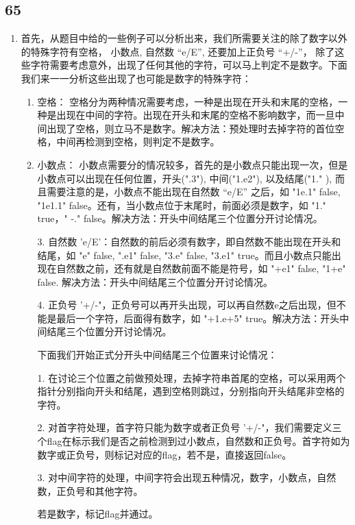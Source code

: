 \documentclass[12pt,a4paper]{article}
\begin{document}
\subsection{65}
\begin{enumerate}
\item
\begin{CJK}{UTF8}{gbsn}
首先，从题目中给的一些例子可以分析出来，我们所需要关注的除了数字以外的特殊字符有空格， 小数点, 自然数 ``e/E'', 还要加上正负号 ``+/-''，
除了这些字符需要考虑意外，出现了任何其他的字符，可以马上判定不是数字。下面我们来一一分析这些出现了也可能是数字的特殊字符：
\begin{enumerate}
\item 空格： 空格分为两种情况需要考虑，一种是出现在开头和末尾的空格，一种是出现在中间的字符。出现在开头和末尾的空格不影响数字，而一旦中间出现了空格，则立马不是数字。解决方法：预处理时去掉字符的首位空格，中间再检测到空格，则判定不是数字。
\item 小数点： 小数点需要分的情况较多，首先的是小数点只能出现一次，但是小数点可以出现在任何位置，开头(".3"), 中间("1.e2"), 以及结尾("1." ), 而且需要注意的是，小数点不能出现在自然数 ``e/E'' 之后，如 "1e.1" false, "1e1.1" false。还有，当小数点位于末尾时，前面必须是数字，如 "1."  true，" -." false。解决方法：开头中间结尾三个位置分开讨论情况。

3. 自然数 'e/E'：自然数的前后必须有数字，即自然数不能出现在开头和结尾，如 "e" false,  ".e1" false, "3.e" false, "3.e1" true。而且小数点只能出现在自然数之前，还有就是自然数前面不能是符号，如 "+e1" false, "1+e" false. 解决方法：开头中间结尾三个位置分开讨论情况。

4. 正负号 '+/-"，正负号可以再开头出现，可以再自然数e之后出现，但不能是最后一个字符，后面得有数字，如  "+1.e+5" true。解决方法：开头中间结尾三个位置分开讨论情况。

 

下面我们开始正式分开头中间结尾三个位置来讨论情况：

1. 在讨论三个位置之前做预处理，去掉字符串首尾的空格，可以采用两个指针分别指向开头和结尾，遇到空格则跳过，分别指向开头结尾非空格的字符。

2. 对首字符处理，首字符只能为数字或者正负号 '+/-"，我们需要定义三个flag在标示我们是否之前检测到过小数点，自然数和正负号。首字符如为数字或正负号，则标记对应的flag，若不是，直接返回false。

3. 对中间字符的处理，中间字符会出现五种情况，数字，小数点，自然数，正负号和其他字符。

若是数字，标记flag并通过。


\end{enumerate}
\end{CJK}
\end{enumerate}
\end{document}
